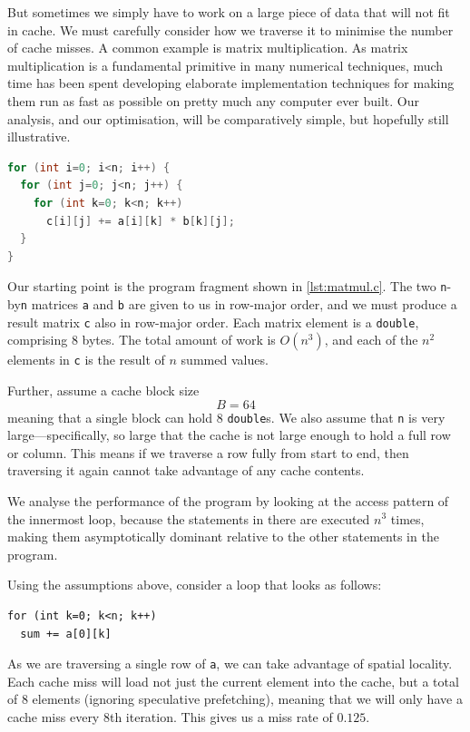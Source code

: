 But sometimes we simply have to work on a large piece of data that
will not fit in cache.  We must carefully consider how we traverse it
to minimise the number of cache misses.  A common example is matrix
multiplication.  As matrix multiplication is a fundamental primitive
in many numerical techniques, much time has been spent developing
elaborate implementation techniques for making them run as fast as
possible on pretty much any computer ever built.  Our analysis, and
our optimisation, will be comparatively simple, but hopefully still
illustrative.

\begin{lstlisting}[caption=Matrix multiplication in C.,
label={lst:matmul.c},
language=C,
frame=single]
for (int i=0; i<n; i++) {
  for (int j=0; j<n; j++) {
    for (int k=0; k<n; k++)
      c[i][j] += a[i][k] * b[k][j];
  }
}
\end{lstlisting}

Our starting point is the program fragment shown in
\cref{lst:matmul.c}.  The two \texttt{n}-by\texttt{n} matrices
\texttt{a} and \texttt{b} are given to us in row-major order, and we
must produce a result matrix \texttt{c} also in row-major order.  Each
matrix element is a \texttt{double}, comprising 8 bytes.  The total
amount of work is $O(n^{3})$, and each of the $n^{2}$ elements in
\texttt{c} is the result of $n$ summed values.

Further, assume a cache block size
\[
  B = 64
\]
meaning that a single block can hold $8$ \texttt{double}s.  We also
assume that \texttt{n} is very large---specifically, so large that the
cache is not large enough to hold a full row or column.  This means if
we traverse a row fully from start to end, then traversing it again
cannot take advantage of any cache contents.

We analyse the performance of the program by looking at the access
pattern of the innermost loop, because the statements in there are
executed $n^{3}$ times, making them asymptotically dominant relative
to the other statements in the program.

Using the assumptions above, consider a loop that looks as follows:
\begin{lstlisting}
for (int k=0; k<n; k++)
  sum += a[0][k]
\end{lstlisting}
As we are traversing a single row of \texttt{a}, we can take advantage
of spatial locality.  Each cache miss will load not just the current
element into the cache, but a total of $8$ elements (ignoring
speculative prefetching), meaning that we will only have a cache miss
every $8$th iteration.  This gives us a miss rate of $0.125$.

